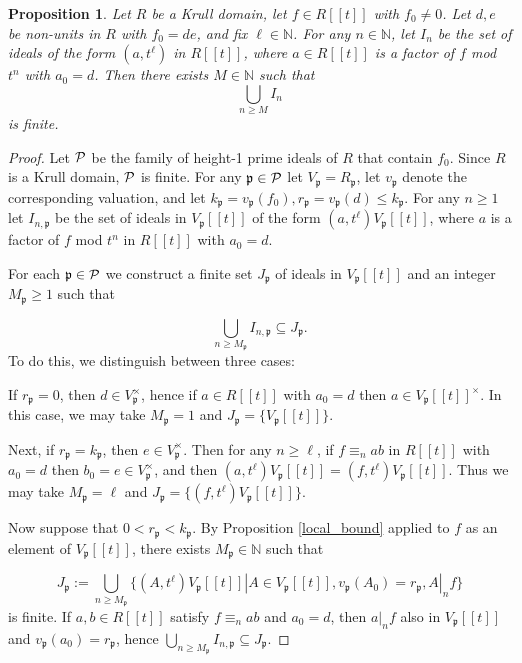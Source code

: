 \documentclass{article}
\newcommand{\N}{\mathbb{N}}
\newcommand{\frp}{\mathfrak{p}}
\theoremstyle{plain}
\newtheorem{proposition}[theorem]{Proposition}
\theoremstyle{definition}
\theoremstyle{remark}
\theoremstyle{plain}
\begin{document}
\begin{proposition}\label{finite_union}
    Let $R$ be a Krull domain, let $f \in R[[t]]$ with $f_0 \neq 0$. Let $d, e$ be non-units in $R$ with $f_0 = de$, and fix $\ell \in \N$. For any $n \in \N$, let $I_n$ be the set of ideals of the form $(a,t^\ell)$ in $R[[t]]$, where $a \in R[[t]]$ is a factor of $f$ mod $t^n$ with $a_0 = d$. Then there exists $M \in \N$ such that 
    $$\bigcup_{n \geq M} I_n$$ is finite. 
\end{proposition}
\begin{proof}

Let $\cal{P}$ be the family of height-1 prime ideals of $R$ that contain $f_0$. Since $R$ is a Krull domain, ${\cal{P}}$ is finite. For any $\frp \in {\cal{P}}$ let $V_\frp = R_{\frp}$, let $v_\frp$ denote the corresponding valuation, and let $k_\frp = v_\frp(f_0), r_\frp = v_\frp(d)\leq k_\frp $. For any $n \geq 1$ let 
$I_{n,\frp}$ be the set of ideals in $V_\frp[[t]]$ of the form $(a,t^\ell)V_\frp[[t]]$, where $a$ is a factor of $f$ mod $t^n$ in $R[[t]]$ with $a_0 = d.$ 

For each $\frp \in {\cal{P}}$ we construct a finite set $J_\frp$ of ideals in $V_\frp[[t]]$ and an integer $M_\frp \geq 1$ such that 

$$\bigcup_{n \geq M_\frp} I_{n,\frp} \subseteq J_\frp.$$
To do this, we distinguish between three cases:

If $r_\frp = 0$, then $d \in V_\frp^\times$, hence if $a\in R[[t]]$ with $a_0 = d$ then $a \in V_\frp[[t]]^\times$. In this case, we may take $M_\frp = 1$ and $J_\frp = \{V_\frp[[t]]\}$. 

Next, if $r_\frp = k_\frp$, then $e \in V_\frp^\times$. Then for any $n \geq \ell$, if $f \equiv_n ab$ in $R[[t]]$ with $a_0 = d$ then $b_0 = e \in V_\frp^\times$, and then $(a,t^\ell)V_\frp[[t]] = (f,t^\ell)V_\frp[[t]]$. Thus we may take $M_\frp = \ell$ and $J_\frp = \{(f,t^\ell)V_\frp[[t]]\}.$

Now suppose that $0 < r_\frp < k_\frp$. By Proposition \ref{local_bound} applied to $f$ as an element of $V_\frp[[t]]$, there exists $M_\frp \in \N$ such that 

$$J_\frp := \bigcup_{n \geq M_\frp}\{(A,t^\ell)V_\frp[[t]] | A \in V_\frp[[t]], v_\frp(A_0) = r_\frp, A|_n f\}$$ is finite. If $a,b \in R[[t]]$ satisfy $f \equiv_n ab$ and $a_0 = d$, then $a|_n f$ also in $V_\frp[[t]]$ and $v_\frp(a_0) = r_\frp$, hence $\bigcup_{n \geq M_\frp} I_{n,\frp} \subseteq J_\frp.$


\end{proof}
\end{document}

